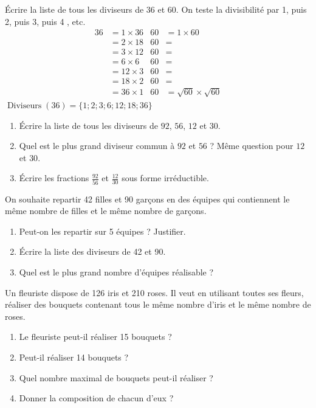 \documentclass[main.tex]{subfiles}
\begin{document}
\newpage 
\begin{example}Écrire la liste de tous les diviseurs de $36$ et $60$.  On teste la divisibilité par 1, puis 2, puis 3, puis 4 , etc.   
	\begin{align*} 
		36 & =1\times 36 & 60 &= 1\times 60\\
		&= 2\times 18 & 60 &=\\
		&= 3\times 12 & 60 &=\\
		&= 6\times 6 & 60 &=\\
		&= 12\times 3 & 60 &=\\
		&= 18\times 2 & 60 &=\\
		& = 36 \times 1 &60 &= \sqrt{60}\times  \sqrt{60}
	\end{align*} 
 $\operatorname{Diviseurs}(36)=\{ 1; 2; 3; 6; 12; 18; 36\}$
\end{example}
\medskip
\begin{exercise} \hfill 
	\begin{enumerate} [label={\alph*)},    leftmargin=*] 
		\item Écrire la liste de tous les diviseurs de  $92$, $56$, $12$ et $30$.
		\item Quel est le plus grand diviseur commun à $92$ et $56$ ? Même question pour $12$ et $30$. 
		\item Écrire les fractions $\frac{92}{56}$ et $\frac{12}{30}$ sous forme irréductible.
	\end{enumerate}
\end{exercise} 
\medskip
 \begin{exercise}[un classique]  \hfill 
 	
 \noindent	On souhaite repartir 42 filles et 90 garçons en des équipes qui contiennent le même nombre de filles et le même nombre de garçons. 
 	\begin{enumerate}[label={\alph*)},    leftmargin=*] 
 		\item Peut-on les repartir sur 5 équipes ? Justifier.
 		\item Écrire la liste des diviseurs de 42 et 90.
 		\item Quel est le plus grand nombre d'équipes réalisable ?
 	\end{enumerate} 
 \end{exercise}
\medskip
 \begin{exercise} \hfill 
 	
 \noindent	Un fleuriste dispose de 126 iris et 210 roses.
 	Il veut en utilisant toutes ses fleurs, réaliser des bouquets contenant tous le même   nombre d’iris et le même nombre de roses.
 	\begin{enumerate}[label={\alph*)},    leftmargin=*] 
 		\item Le fleuriste peut-il réaliser 15 bouquets ?
 		\item  Peut-il réaliser 14 bouquets ? 
		\item   Quel nombre maximal de bouquets peut-il réaliser ?
		\item    Donner la composition de chacun d’eux ? 
 	\end{enumerate}  
 \end{exercise} 
\end{document}
